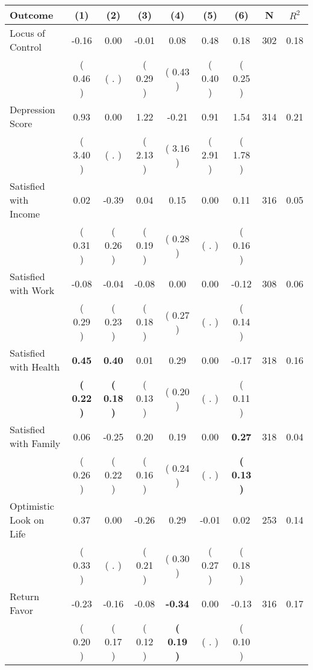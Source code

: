 \begin{tabular}{lcccccccc}
\toprule
 \textbf{Outcome} & \textbf{(1)} & \textbf{(2)} & \textbf{(3)} & \textbf{(4)} & \textbf{(5)} & \textbf{(6)} & \textbf{N} & \textbf{$ R^2$} \\
\midrule
Locus of Control &     -0.16 &      0.00 &     -0.01 &      0.08 &      0.48 &      0.18 & 302 &       0.18 \\ 
 & (     0.46 ) & (        . ) & (     0.29 ) & (     0.43 ) & (     0.40 ) & (     0.25 ) & \\
Depression Score &      0.93 &      0.00 &      1.22 &     -0.21 &      0.91 &      1.54 & 314 &       0.21 \\ 
 & (     3.40 ) & (        . ) & (     2.13 ) & (     3.16 ) & (     2.91 ) & (     1.78 ) & \\
Satisfied with Income &      0.02 &     -0.39 &      0.04 &      0.15 &      0.00 &      0.11 & 316 &       0.05 \\ 
 & (     0.31 ) & (     0.26 ) & (     0.19 ) & (     0.28 ) & (        . ) & (     0.16 ) & \\
Satisfied with Work &     -0.08 &     -0.04 &     -0.08 &      0.00 &      0.00 &     -0.12 & 308 &       0.06 \\ 
 & (     0.29 ) & (     0.23 ) & (     0.18 ) & (     0.27 ) & (        . ) & (     0.14 ) & \\
Satisfied with Health & \textbf{     0.45} & \textbf{     0.40} &      0.01 &      0.29 &      0.00 &     -0.17 & 318 &       0.16 \\ 
 & \textbf{(     0.22 )} & \textbf{(     0.18 )} & (     0.13 ) & (     0.20 ) & (        . ) & (     0.11 ) & \\
Satisfied with Family &      0.06 &     -0.25 &      0.20 &      0.19 &      0.00 & \textbf{     0.27} & 318 &       0.04 \\ 
 & (     0.26 ) & (     0.22 ) & (     0.16 ) & (     0.24 ) & (        . ) & \textbf{(     0.13 )} & \\
Optimistic Look on Life &      0.37 &      0.00 &     -0.26 &      0.29 &     -0.01 &      0.02 & 253 &       0.14 \\ 
 & (     0.33 ) & (        . ) & (     0.21 ) & (     0.30 ) & (     0.27 ) & (     0.18 ) & \\
Return Favor &     -0.23 &     -0.16 &     -0.08 & \textbf{    -0.34} &      0.00 &     -0.13 & 316 &       0.17 \\ 
 & (     0.20 ) & (     0.17 ) & (     0.12 ) & \textbf{(     0.19 )} & (        . ) & (     0.10 ) & \\

\end{tabular}
